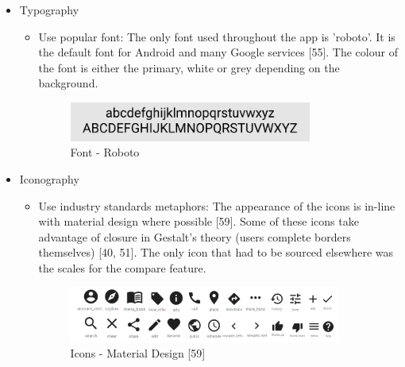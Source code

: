 \documentclass[a4 paper, 12pt]{article}
\begin{document}
\begin{itemize}
            \item Typography
                \begin{itemize}
                    \item Use popular font: The only font used throughout the app is 'roboto'. It is the default font for Android and many Google services [55]. The colour of the font is either the primary, white or grey depending on the background.
                    \begin{figure} [H]
                        \centering
                        \includegraphics[width=0.8\textwidth, frame]
                            {./Med_Fidelity/Med_Report/images/font.PNG}
                        \caption{Font - Roboto}
                    \end{figure}                    
                \end{itemize}

            \item Iconography
                \begin{itemize}
                    \item Use industry standards metaphors: The appearance of the icons is in-line with material design where possible [59]. Some of these icons take advantage of closure in Gestalt's theory (users complete borders themselves) [40, 51]. The only icon that had to be sourced elsewhere was the scales for the compare feature.  
                    \begin{figure} [H]
                        \centering
                        \includegraphics[width=0.9\textwidth, frame]
                            {./Med_Fidelity/Med_Report/images/material_icons.PNG}    
                        \caption{Icons - Material Design [59]}
                    \end{figure}   
                \end{itemize}           


\end{itemize}
\end{document}
